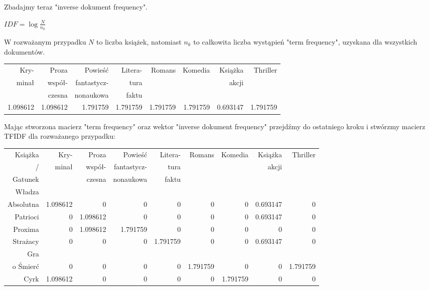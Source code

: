 \documentclass[12pt,a4paper]{report}
\begin{document}
\normalsize{
\\
\\Zbadajmy teraz "inverse dokument frequency".
\begin{center}
\begin{math}IDF = \log \frac{N}{n_k} \end{math}
\end{center}
W rozważanym przypadku $N$ to liczba książek, natomiast $n_k$ to całkowita liczba wystąpień "term frequency", uzyskana dla wszystkich dokumentów.
}
\begin{center}
\begin{tabular}{|r|r|r|r|r|r|r|r|} \hline
Kry- & Proza &  Powieść & Litera- & Romans & Komedia & Książka & Thriller\\
minał & współ- &  fantastycz- & tura &  &  & akcji & \\
 & czesna &  nonaukowa & faktu &  &  &  & \\
\hline \hline 
1.098612 & 1.098612 & 1.791759 & 1.791759 & 1.791759 & 1.791759 & 0.693147 & 1.791759 \\
\hline
\end{tabular}
\end{center}
\normalsize{Mając stworzona macierz "term frequency" oraz wektor "inverse dokument frequency" przejdźmy do ostatniego kroku i stwórzmy macierz TFIDF dla rozważanego przypadku:}
\begin{center}

\footnotesize{
\begin{tabular}{|r|r|r|r|r|r|r|r|r|} \hline
Książka  & Kry- & Proza &  Powieść & Litera- & Romans & Komedia & Książka & Thriller\\
/ & minał & współ- &  fantastycz- & tura &  &  & akcji & \\
Gatunek & & czesna &  nonaukowa & faktu &  &  &  & \\
\hline 
Władza & &  &  &  &  & &  &  \\
Absolutna & 1.098612 & 0 & 0 & 0 & 0 & 0 & 0.693147 & 0 \\
\hline
Patrioci & 0 & 1.098612 & 0 & 0 & 0 & 0 & 0.693147 & 0 \\
\hline
Proxima & 0 & 1.098612 & 1.791759 & 0 & 0 & 0 & 0 & 0 \\
\hline
Strażacy & 0 & 0 & 0 &1.791759 & 0 & 0 & 0.693147 & 0 \\
\hline
Gra & &  &  &  &  & &  &  \\
o Śmierć & 0 & 0 & 0 & 0 & 1.791759 & 0 & 0 & 1.791759 \\
\hline
Cyrk & 1.098612 & 0 & 0 & 0 & 0 & 1.791759 & 0 & 0\\
\hline
\end{tabular}
}
\end{center}
\end{document}
